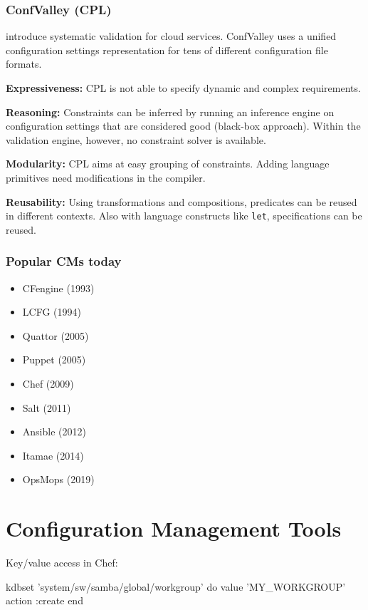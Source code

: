 \begin{frame}
	\frametitle{ConfValley (CPL)}

	\citet{huang2015confvalley} introduce systematic validation for cloud services.
	ConfValley uses a unified configuration settings representation for tens of different configuration file formats.

	\textbf{Expressiveness:}
	CPL is not able to specify dynamic and complex requirements.

	\textbf{Reasoning:}
	Constraints can be inferred by running an inference engine on configuration settings that are considered good (black-box approach).
	Within the validation engine, however, no constraint solver is available.

	\textbf{Modularity:}
	CPL aims at easy grouping of constraints.
	Adding language primitives need modifications in the compiler.

	\textbf{Reusability:}
	Using transformations and compositions, predicates can be reused in different contexts.
	Also with language constructs like \texttt{let}, specifications can be reused.
\end{frame}

\begin{frame}
	\frametitle{Popular CMs today}

	\begin{itemize}[<+-| alert@+>]
	\item CFengine (1993)
	\item LCFG (1994)
	\item Quattor (2005)
	\item Puppet (2005)
	\item Chef (2009)
	\item Salt (2011)
	\item Ansible (2012)
	\item Itamae (2014)
	\item OpsMops (2019)
	\end{itemize}
\end{frame}




\section{Configuration Management Tools}

\begin{frame}[fragile]
	Key/value access in Chef:

	\begin{code}[morekeywords={kdbset,do,action,value,end},gobble=4]
	kdbset 'system/sw/samba/global/workgroup' do
		value 'MY_WORKGROUP'
		action :create
	end
	\end{code}
\end{frame}

